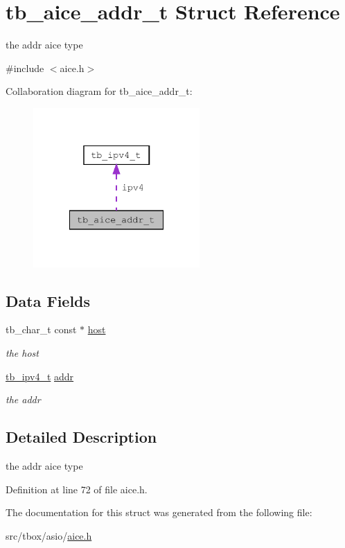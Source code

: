 \hypertarget{structtb__aice__addr__t}{\section{tb\-\_\-aice\-\_\-addr\-\_\-t Struct Reference}
\label{structtb__aice__addr__t}
}


the addr aice type  




{\ttfamily \#include $<$aice.\-h$>$}



Collaboration diagram for tb\-\_\-aice\-\_\-addr\-\_\-t\-:\nopagebreak
\begin{figure}[H]
\begin{center}
\leavevmode
\includegraphics[width=180pt]{dd/d3f/structtb__aice__addr__t__coll__graph}
\end{center}
\end{figure}
\subsection*{Data Fields}
\begin{DoxyCompactItemize}
\item 
\hypertarget{structtb__aice__addr__t_a8bc4910711bdbff2595e93b80e215084}{tb\-\_\-char\-\_\-t const $\ast$ \hyperlink{structtb__aice__addr__t_a8bc4910711bdbff2595e93b80e215084}{host}}\label{structtb__aice__addr__t_a8bc4910711bdbff2595e93b80e215084}

\begin{DoxyCompactList}\small\item\em the host \end{DoxyCompactList}\item 
\hypertarget{structtb__aice__addr__t_a97dcbfdfeda7d7776a7f19606eaa0540}{\hyperlink{uniontb__ipv4__t}{tb\-\_\-ipv4\-\_\-t} \hyperlink{structtb__aice__addr__t_a97dcbfdfeda7d7776a7f19606eaa0540}{addr}}\label{structtb__aice__addr__t_a97dcbfdfeda7d7776a7f19606eaa0540}

\begin{DoxyCompactList}\small\item\em the addr \end{DoxyCompactList}\end{DoxyCompactItemize}


\subsection{Detailed Description}
the addr aice type 

Definition at line 72 of file aice.\-h.



The documentation for this struct was generated from the following file\-:\begin{DoxyCompactItemize}
\item 
src/tbox/asio/\hyperlink{aice_8h}{aice.\-h}\end{DoxyCompactItemize}
